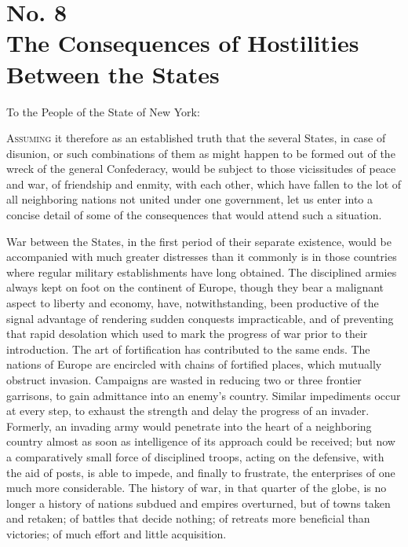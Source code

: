 \chapter[No. 8: The Consequences of Hostilities Between the States]{No. 8\\ {\small The Consequences of Hostilities Between the States}}
To the People of the State of New York:
\vspace{.25cm}

\textsc{Assuming }it therefore as an established truth that the several States, in case of disunion, or such combinations of them as might happen to be formed out of the wreck of the general Confederacy, would be subject to those vicissitudes of peace and war, of friendship and enmity, with each other, which have fallen to the lot of all neighboring nations not united under one government, let us enter into a concise detail of some of the consequences that would attend such a situation.

War between the States, in the first period of their separate existence, would be accompanied with much greater distresses than it commonly is in those countries where regular military establishments have long obtained. The disciplined armies always kept on foot on the continent of Europe, though they bear a malignant aspect to liberty and economy, have, notwithstanding, been productive of the signal advantage of rendering sudden conquests impracticable, and of preventing that rapid desolation which used to mark the progress of war prior to their introduction. The art of fortification has contributed to the same ends. The nations of Europe are encircled with chains of fortified places, which mutually obstruct invasion. Campaigns are wasted in reducing two or three frontier garrisons, to gain admittance into an enemy's country. Similar impediments occur at every step, to exhaust the strength and delay the progress of an invader. Formerly, an invading army would penetrate into the heart of a neighboring country almost as soon as intelligence of its approach could be received; but now a comparatively small force of disciplined troops, acting on the defensive, with the aid of posts, is able to impede, and finally to frustrate, the enterprises of one much more considerable. The history of war, in that quarter of the globe, is no longer a history of nations subdued and empires overturned, but of towns taken and retaken; of battles that decide nothing; of retreats more beneficial than victories; of much effort and little acquisition.

